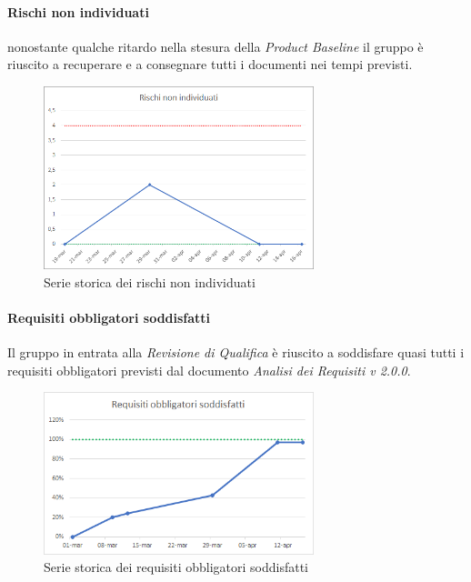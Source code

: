 	\paragraph{Rischi non individuati} \Spazio
	nonostante qualche ritardo nella stesura della \textit{Product Baseline} il gruppo è riuscito a recuperare e a consegnare tutti i documenti nei tempi previsti. 
	\begin{figure}[H]
		\centering 
		\includegraphics[width=0.7\textwidth]{Images/rischiNI.png}
		\caption{Serie storica dei rischi non individuati}
		\label{rischi} 
	\end{figure}
    \paragraph{Requisiti obbligatori soddisfatti} \Spazio
    Il gruppo in entrata alla \emph{Revisione di Qualifica} è riuscito a soddisfare quasi tutti i requisiti obbligatori previsti dal documento \textit{Analisi dei Requisiti v 2.0.0}.
    \begin{figure}[H]
    	\centering 
    	\includegraphics[width=0.7\textwidth]{Images/obbl.png}
    	\caption{Serie storica dei requisiti obbligatori soddisfatti}
    	\label{obbl} 
    \end{figure}
